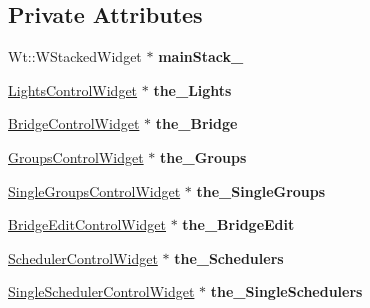 \subsection*{Private Attributes}
\begin{DoxyCompactItemize}
\item 
Wt\+::\+W\+Stacked\+Widget $\ast$ {\bfseries main\+Stack\+\_\+}\hypertarget{classHueApp_a9ed5493a6b9a1651c8ad035c656d15e5}{}\label{classHueApp_a9ed5493a6b9a1651c8ad035c656d15e5}

\item 
\hyperlink{classLightsControlWidget}{Lights\+Control\+Widget} $\ast$ {\bfseries the\+\_\+\+Lights}\hypertarget{classHueApp_af56dcc0d22552d50417533c087816599}{}\label{classHueApp_af56dcc0d22552d50417533c087816599}

\item 
\hyperlink{classBridgeControlWidget}{Bridge\+Control\+Widget} $\ast$ {\bfseries the\+\_\+\+Bridge}\hypertarget{classHueApp_a6ec8432c5f76ef8c5799da130d39965c}{}\label{classHueApp_a6ec8432c5f76ef8c5799da130d39965c}

\item 
\hyperlink{classGroupsControlWidget}{Groups\+Control\+Widget} $\ast$ {\bfseries the\+\_\+\+Groups}\hypertarget{classHueApp_ae8a1698036628944f71e6bb985de7335}{}\label{classHueApp_ae8a1698036628944f71e6bb985de7335}

\item 
\hyperlink{classSingleGroupsControlWidget}{Single\+Groups\+Control\+Widget} $\ast$ {\bfseries the\+\_\+\+Single\+Groups}\hypertarget{classHueApp_aa13e55cb1398a69aa97a8848d0981637}{}\label{classHueApp_aa13e55cb1398a69aa97a8848d0981637}

\item 
\hyperlink{classBridgeEditControlWidget}{Bridge\+Edit\+Control\+Widget} $\ast$ {\bfseries the\+\_\+\+Bridge\+Edit}\hypertarget{classHueApp_a44bc78ed5bb36ebce557363fef3b94b3}{}\label{classHueApp_a44bc78ed5bb36ebce557363fef3b94b3}

\item 
\hyperlink{classSchedulerControlWidget}{Scheduler\+Control\+Widget} $\ast$ {\bfseries the\+\_\+\+Schedulers}\hypertarget{classHueApp_ae31f2868c0c0123f27ca4d60f7d63c0b}{}\label{classHueApp_ae31f2868c0c0123f27ca4d60f7d63c0b}

\item 
\hyperlink{classSingleSchedulerControlWidget}{Single\+Scheduler\+Control\+Widget} $\ast$ {\bfseries the\+\_\+\+Single\+Schedulers}\hypertarget{classHueApp_a1276df7c9c9b020a7a8462495c6c1b32}{}\label{classHueApp_a1276df7c9c9b020a7a8462495c6c1b32}


\end{DoxyCompactItemize}
